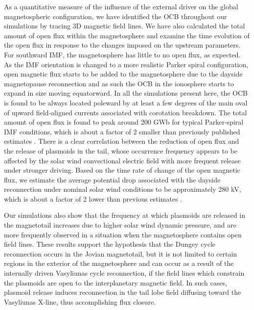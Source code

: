 As a quantitative measure of the influence of the external driver on the global magnetospheric configuration, we have identified the OCB throughout our simulations by tracing 3D magnetic field lines. We have also calculated the total amount of open flux within the magnetosphere and examine the time evolution of the open flux in response to the changes imposed on the upstream parameters. For southward IMF, the magnetosphere has little to no open flux, as expected. As the IMF orientation is changed to a more realistic Parker spiral configuration, open magnetic flux starts to be added to the magnetosphere due to the dayside magnetopause reconnection and as such the OCB in the ionosphere starts to expand in size moving equatorward. In all the simulations present here, the OCB is found to be always located poleward by at least a few degrees of the main oval of upward field‐aligned currents associated with corotation breakdown. The total amount of open flux is found to peak around 200 GWb for typical Parker‐spiral IMF conditions, which is about a factor of 2 smaller than previously published estimates \cite{Vogt2011a}. There is a clear correlation between the reduction of open flux and the release of plasmoids in the tail, whose occurrence frequency appears to be affected by the solar wind convectional electric field with more frequent release under stronger driving. Based on the time rate of change of the open magnetic flux, we estimate the average potential drop associated with the dayside reconnection under nominal solar wind conditions to be approximately 280 kV, which is about a factor of 2 lower than previous estimates \cite{Masters2017}. 

Our simulations also show that the frequency at which plasmoids are released in the magnetotail increases due to higher solar wind dynamic pressure, and are more frequently observed in a situation when the magnetosphere contains open field lines. These results support the hypothesis that the Dungey cycle reconnection occurs in the Jovian magnetotail, but it is not limited to certain regions in the exterior of the magnetosphere and can occur as a result of the internally driven Vasyliunas cycle reconnection, if the field lines which constrain the plasmoids are open to the interplanetary magnetic field. In such cases, plasmoid release induces reconnection in the tail lobe field diffusing toward the Vasyliunas X-line, thus accomplishing flux closure. 
